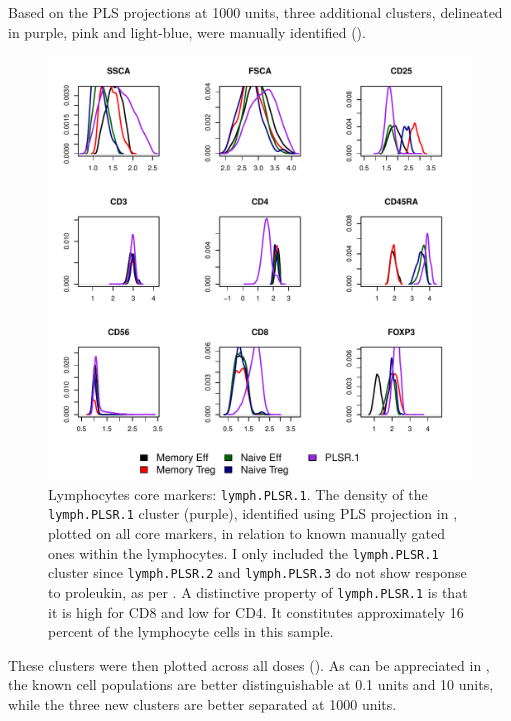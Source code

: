 Based on the \gls{PLS} projections at 1000 units, three additional clusters, delineated in purple, pink and light-blue, were manually identified
().
\begin{figure}[!h]
\centering
\includegraphics[scale=.7]{figures/plsr-lymphocytes-clusters}
{ Lymphocytes core markers: \texttt{lymph.PLSR.1}. }
{
    The density of the \texttt{lymph.PLSR.1} cluster (purple), identified using \gls{PLS} projection in ,
    plotted  on all core markers, in relation to known manually gated ones within the lymphocytes.
    I only included the \texttt{lymph.PLSR.1} cluster since \texttt{lymph.PLSR.2} and \texttt{lymph.PLSR.3} do not show response to proleukin, as per .
    A distinctive property of \texttt{lymph.PLSR.1} is that it is high for CD8 and low for CD4.
    It constitutes approximately 16 percent of the lymphocyte cells in this sample.
}
\end{figure}
These clusters were then plotted across all doses ().
As can be appreciated in , the known cell populations are better distinguishable at 0.1 units and 10 units, while the three new clusters are better separated at 1000 units.
